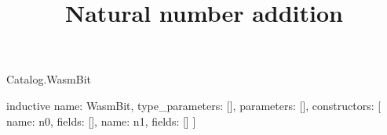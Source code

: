 \begin{lexlean}{Catalog.WasmBit}
\title{Natural number addition}
\begin{semanticmodule}
inductive{
  name: WasmBit,
  type_parameters: [],
  parameters: [],
  constructors: [
    {name: n0, fields: []},
    {name: n1, fields: []}
  ]
}
\end{semanticmodule}
\end{lexlean}
